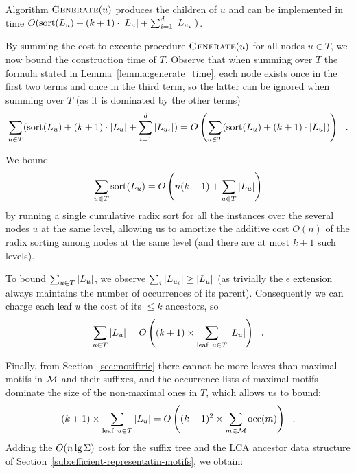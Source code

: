 \begin{lemma}
  \label{lemma:generate_time}
  Algorithm $\operatorname{\textsc{Generate}}(u)$ produces the children of $u$ and can be implemented in time $O(\operatorname{sort}(L_{u}) + (k+1) \cdot |L_{u}| + \sum_{i=1}^d |L_{u_i}|)$. 
\end{lemma}


%
By summing the cost to execute procedure $\operatorname{\textsc{Generate}}(u)$ for all nodes $u \in T$, we now bound the construction time of $T$. Observe that when summing over $T$ the formula stated in Lemma~\ref{lemma:generate_time}, each node exists once in the first two terms and once in the third term, so the latter can be ignored when summing over $T$ (as it is dominated by the other terms)
\[
\sum_{u \in T} (\operatorname{sort}(L_{u}) + (k+1) \cdot |L_{u}| + \sum_{i=1}^d |L_{u_i}|) = O\left(\sum_{u \in   T} (\operatorname{sort}(L_{u}) + (k+1) \cdot |L_{u}|) \right) ~~ .
\]

\noindent We bound 
\[
\sum_{u \in T} \operatorname{sort}(L_{u}) = O\left( n(k+1) + \sum_{u \in T} |L_{u}|\right)
\] 
by running a single cumulative radix sort for all the instances over the several nodes $u$ at the same level, allowing us to amortize the additive cost $O(n)$ of the radix sorting among nodes at the same level (and there are at most $k+1$ such levels).

To bound $\sum_{u \in T} |L_{u}|$, we observe $\sum_i |L_{u_i}| \geq |L_{u}|$ (as trivially the $\epsilon$ extension always maintains the number of occurrences of its parent). Consequently we can charge each leaf $u$ the cost of its $\leq k$ ancestors, so \[
\sum_{u \in T} |L_{u}| = O\left((k+1) \times \sum_{\mathrm{leaf\ }u \in T} |L_{u}|\right) ~~ .
\]

Finally, from Section~\ref{sec:motiftrie} there cannot be more leaves than maximal motifs in $\mathcal{M}$ and their suffixes, and the occurrence lists of maximal motifs dominate the size of the non-maximal ones in $T$, which allows us to bound: 
\[
(k+1) \times \sum_{\mathrm{leaf\ }u \in T} |L_{u}| = O\left((k+1)^2 \times \sum_{m \in \mathcal{M}} \operatorname{occ}(m)\right) ~~ .
\]   
Adding the $O(n \lg \Sigma)$ cost for the suffix tree and the LCA ancestor data structure of Section~\ref{sub:efficient-representatin-motifs}, we obtain:


